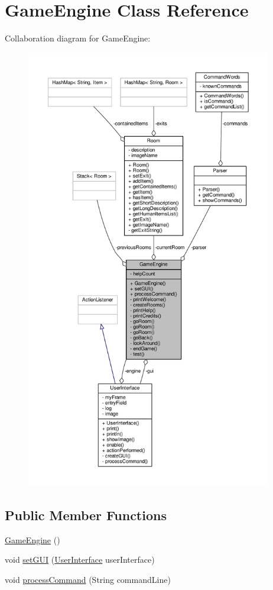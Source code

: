 \hypertarget{classGameEngine}{\section{Game\-Engine Class Reference}
\label{classGameEngine}
}


Collaboration diagram for Game\-Engine\-:
\nopagebreak
\begin{figure}[H]
\begin{center}
\leavevmode
\includegraphics[height=550pt]{classGameEngine__coll__graph}
\end{center}
\end{figure}
\subsection*{Public Member Functions}
\begin{DoxyCompactItemize}
\item 
\hyperlink{classGameEngine_a9e8a92f5021a34293060f9aaff4005de}{Game\-Engine} ()
\item 
void \hyperlink{classGameEngine_aec901a5b590b3cd204f196165da5dfb6}{set\-G\-U\-I} (\hyperlink{classUserInterface}{User\-Interface} user\-Interface)
\item 
void \hyperlink{classGameEngine_ad7133885f313fa99bca3bb7cb8272f64}{process\-Command} (String command\-Line)
\end{DoxyCompactItemize}
